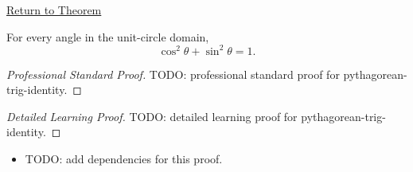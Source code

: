 \newpage
{}
\label{prf:pythagorean-trig-identity}

\begin{remark*}[Return]
\hyperref[thm:pythagorean-trig-identity]{Return to Theorem}
\end{remark*}

\begin{theorem*}
For every angle in the unit-circle domain,
\[
  \cos^2\theta+\sin^2\theta=1.
\]
\end{theorem*}

\begin{proof}[Professional Standard Proof]
\LRAProofBodyStart
TODO: professional standard proof for pythagorean-trig-identity.
\end{proof}

\begin{proof}[Detailed Learning Proof]
\LRAProofBodyStart
TODO: detailed learning proof for pythagorean-trig-identity.
\end{proof}

\begin{remark*}
\end{remark*}

\begin{dependencies}
\begin{itemize}
  \item TODO: add dependencies for this proof.
\end{itemize}
\end{dependencies}

\clearpage

